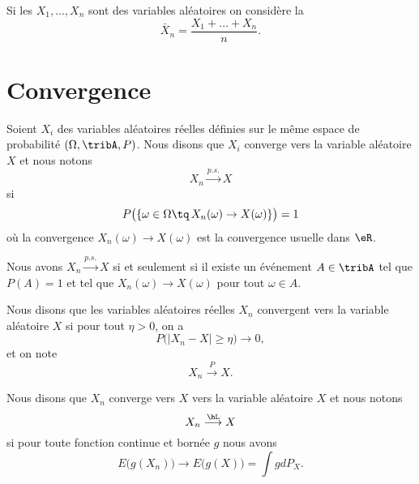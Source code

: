 Si les \( X_1,\ldots,X_n\) sont des variables aléatoires on considère la 
\begin{equation}
    \bar X_n=\frac{ X_1+\ldots+X_n }{ n }.
\end{equation}

\section{Convergence}

Soient \( X_i\) des variables aléatoires réelles définies sur le même espace de probabilité \( (\Omega,\tribA,P)\). Nous disons que \( X_i\) converge  vers la variable aléatoire \( X\) et nous notons 
\begin{equation}
    X_n\stackrel{p.s.}{\longrightarrow}X
\end{equation}
si
\begin{equation}
    P\big( \{ \omega\in\Omega\tq\,X_n(\omega)\to X(\omega) \} \big)=1
\end{equation}
où la convergence \( X_n(\omega)\to X(\omega)\) est la convergence usuelle dans \( \eR\).

\begin{lemma}
    Nous avons \( X_n\stackrel{p.s.}{\longrightarrow}X\) si et seulement si il existe un événement \( A\in\tribA\) tel que \( P(A)=1\) et tel que \( X_n(\omega)\to X(\omega)\) pour tout \( \omega\in A\).
\end{lemma}

Nous disons que les variables aléatoires réelles \( X_n\) convergent  vers la variable aléatoire \( X\) si pour tout \( \eta>0\), on a
\begin{equation}
    P\big( | X_n-X |\geq \eta \big)\to 0,
\end{equation}
et on note
\begin{equation}
    X_n\stackrel{P}{\longrightarrow}X.
\end{equation}

Nous disons que \( X_n\) converge vers \( X\)  vers la variable aléatoire \( X\) et nous notons
\begin{equation}
    X_n\stackrel{\hL}{\longrightarrow}X
\end{equation}
si pour toute fonction continue et bornée \( g\) nous avons
\begin{equation}
    E\big( g(X_n) \big)\to E\big( g(X) \big)=\int gdP_X.
\end{equation}


